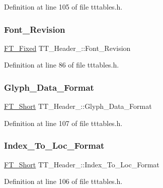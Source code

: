 Definition at line 105 of file tttables.\+h.

\mbox{\label{struct_t_t___header___aa5d0f9f88a7ffc755982a1a9dbb58f21}} 
\subsubsection{\texorpdfstring{Font\_Revision}{Font\_Revision}}
{\footnotesize\ttfamily \mbox{\hyperlink{fttypes_8h_a5f5a679cc09f758efdd0d1c5feed3c3d}{F\+T\+\_\+\+Fixed}} T\+T\+\_\+\+Header\+\_\+\+::\+Font\+\_\+\+Revision}



Definition at line 86 of file tttables.\+h.

\mbox{\label{struct_t_t___header___adeeedce4bb708c3e068ed80366ec921d}} 
\subsubsection{\texorpdfstring{Glyph\_Data\_Format}{Glyph\_Data\_Format}}
{\footnotesize\ttfamily \mbox{\hyperlink{fttypes_8h_aa7279be89046a2563cd3d4d6651fbdcf}{F\+T\+\_\+\+Short}} T\+T\+\_\+\+Header\+\_\+\+::\+Glyph\+\_\+\+Data\+\_\+\+Format}



Definition at line 107 of file tttables.\+h.

\mbox{\label{struct_t_t___header___a05a488607bfae319de096b4bd9cf8c6d}} 
\subsubsection{\texorpdfstring{Index\_To\_Loc\_Format}{Index\_To\_Loc\_Format}}
{\footnotesize\ttfamily \mbox{\hyperlink{fttypes_8h_aa7279be89046a2563cd3d4d6651fbdcf}{F\+T\+\_\+\+Short}} T\+T\+\_\+\+Header\+\_\+\+::\+Index\+\_\+\+To\+\_\+\+Loc\+\_\+\+Format}



Definition at line 106 of file tttables.\+h.

